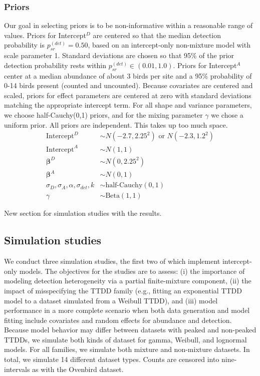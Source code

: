 \documentclass[useAMS,usenatbib,referee,12pt]{article}
\newcommand{\jarad}[1]{{\color{red} #1}}
\begin{document}
\subsubsection{Priors}\label{sec:priors}
Our goal in selecting priors is to be non-informative within a reasonable range of values.  Priors for Intercept$^D$ are centered so that the median detection probability is $p_{sr}^{(det)} = 0.50$, based on an intercept-only non-mixture model with scale parameter 1.  Standard deviations are chosen so that 95\% of the prior detection probability rests within $p_{sr}^{(det)} \in (0.01, 1.0)$.  Priors for Intercept$^A$ center at a median abundance of about 3 birds per site and a 95\% probability of 0-14 birds present (counted and uncounted).  Because covariates are centered and scaled, priors for effect parameters are centered at zero with standard deviations matching the appropriate intercept term.  For all shape and variance parameters, we choose half-Cauchy(0,1) priors, and for the mixing parameter $\gamma$ we chose a uniform prior.  All priors are independent.
\jarad{This takes up too much space.}
\begin{align*}
\text{Intercept}^D &\sim N(-2.7, 2.25^2) \text{ or } N(-2.3, 1.2^2)\\
\text{Intercept}^A &\sim N(1, 1)\\
\boldsymbol{\beta}^D &\sim N(0, 2.25^2)\\
\boldsymbol{\beta}^A &\sim N(0, 1)\\
\sigma_D, \sigma_A, \alpha, \sigma_{det}, k &\sim \text{half-Cauchy}(0,1)\\
\gamma &\sim \text{Beta}(1,1)
\end{align*}

\jarad{New section for simulation studies with the results.}

\subsection{Simulation studies}

We conduct three simulation studies, the first two of which implement intercept-only models.  The objectives for the studies are to assess: (i) the importance of modeling detection heterogeneity via a partial finite-mixture component, (ii) the impact of misspecifying the TTDD family (e.g., fitting an exponential TTDD model to a dataset simulated from a Weibull TTDD), and (iii) model performance in a more complete scenario when both data generation and model fitting include covariates and random effects for abundance and detection.  Because model behavior may differ between datasets with peaked and non-peaked TTDDs, we simulate both kinds of dataset for gamma, Weibull, and lognormal models.  For all families, we simulate both mixture and non-mixture datasets.  In total, we simulate 14 different dataset types.  Counts are censored into nine-intervals as with the Ovenbird dataset.
\end{document}
